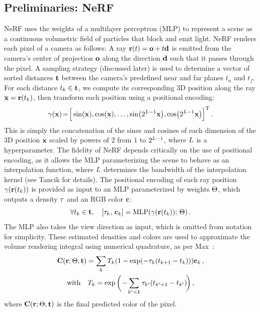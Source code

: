 \documentclass[10pt,twocolumn,letterpaper]{article}
\begin{document}
\subsection{Preliminaries: NeRF}
\label{sec:prelim_nerf}

NeRF uses the weights of a multilayer perceptron (MLP) to represent a scene as a continuous volumetric field of particles that block and emit light. NeRF renders each pixel of a camera as follows:
A ray $\mathbf{r}(t) = \mathbf{o} + t \mathbf{d}$ is emitted from the camera's center of projection $\mathbf{o}$ along the direction $\mathbf{d}$ such that it passes through the pixel. A sampling strategy (discussed later) is used to determine a vector of sorted distances $\mathbf{t}$ between the camera's predefined near and far planes $t_n$ and $t_f$. For each distance $t_k \in \mathbf{t}$, we compute its corresponding 3D position along the ray $\mathbf{x} = \mathbf{r}(t_k)$, then transform each position using a positional encoding:
\small
\begin{equation}
    \gamma(\mathbf{x})\!=\!\Big[ \sin(\mathbf{x}), \cos(\mathbf{x}), \ldots, \sin\!\big(2^{L-1} \mathbf{x}\big), \cos\!\big(2^{L-1} \mathbf{x}\big) \Big]^{\operatorname{T}} \,. \label{eq:posenc}
\end{equation}
\normalsize
This is simply the concatenation of the sines and cosines of each dimension of the 3D position $\mathbf{x}$ scaled by powers of 2 from $1$ to $2^{L-1}$, where $L$ is a hyperparameter. The fidelity of NeRF depends critically on the use of positional encoding, as it allows the MLP parameterizing the scene to behave as an interpolation function, where $L$ determines the bandwidth of the interpolation kernel (see Tancik \etal \cite{tancik2020fourfeat} for details).
The positional encoding of each ray position $\gamma(\mathbf{r}(t_k))$ is provided as input to an MLP parameterized by weights $\Theta$, which outputs a density $\tau$ and an RGB color $\mathbf{c}$:
\begin{equation}
    \forall \zval_k \in \zvec, \quad [\density_k, \, \col_k] = \mlp\left( \gamma\left(\ray(t_k)\right); \, \modelweights \right) \, .\label{eq:nerf_mlp}
\end{equation}
The MLP also takes the view direction as input, which is omitted from notation for simplicity.
These estimated densities and colors are used to approximate the volume rendering integral using numerical quadrature, as per Max~\cite{max1995optical}:
\begin{gather}
\Col(\ray; \modelweights, \zvec) = \sum_{k} T_k \left(1-\exp(-\density_k (t_{k+1} - t_k)) \right) \col_k \,, \nonumber \\
    \textrm{with}\quad T_k = \exp \bigg(\!-\! \sum_{k' < k}  \density_{k'} \left(t_{k'+1} - t_{k'} \right)\!\bigg)\,, \label{eq:nerf_render}
\end{gather}
where $\mathbf{C}(\mathbf{r}; \Theta, \mathbf{t})$ is the final predicted color of the pixel.
\end{document}
